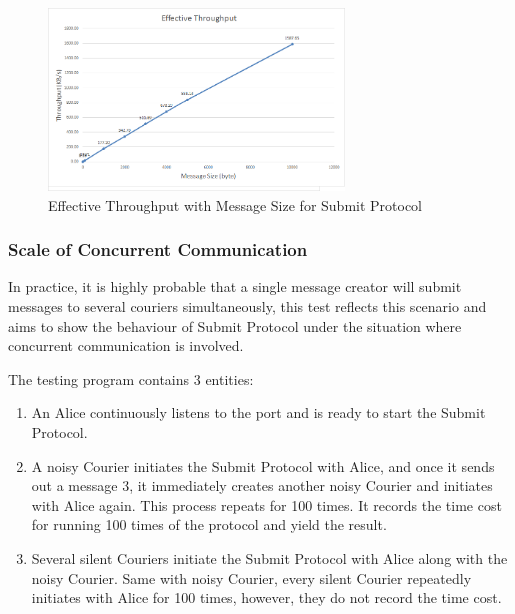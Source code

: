 \begin{figure}[h!]
\centering
\includegraphics[width=0.7\textwidth,natwidth=809,natheight=499]{figures/effectivethroughputsubmit.png}
\caption{Effective Throughput with Message Size for Submit Protocol}
\label{fig:effectivethroughputsubmit}
\end{figure}

\subsubsection{Scale of Concurrent Communication}
In practice, it is highly probable that a single message creator will submit messages to several couriers simultaneously, this test reflects this scenario and aims to show the behaviour of Submit Protocol under the situation where concurrent communication is involved.

The testing program contains 3 entities:
\begin{enumerate}
\item An Alice continuously listens to the port and is ready to start the Submit Protocol.
\item A noisy Courier initiates the Submit Protocol with Alice, and once it sends out a message 3, it immediately creates another noisy Courier and initiates with Alice again. This process repeats for 100 times. It records the time cost for running 100 times of the protocol and yield the result.
\item Several silent Couriers initiate the Submit Protocol with Alice along with the noisy Courier. Same with noisy Courier, every silent Courier repeatedly initiates with Alice for 100 times, however, they do not record the time cost.
\end{enumerate}

